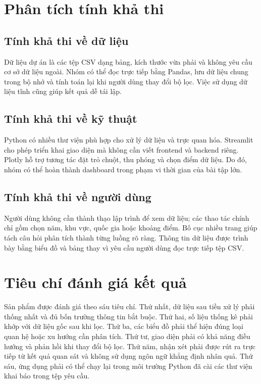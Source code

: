 \section{Phân tích tính khả thi}

\subsection{Tính khả thi về dữ liệu}

Dữ liệu dự án là các tệp CSV dạng bảng, kích thước vừa phải và không yêu cầu cơ sở dữ liệu ngoài. Nhóm có thể đọc trực tiếp bằng Pandas, lưu dữ liệu chung trong bộ nhớ và tính toán lại khi người dùng thay đổi bộ lọc. Việc sử dụng dữ liệu tĩnh cũng giúp kết quả dễ tái lập.

\subsection{Tính khả thi về kỹ thuật}

Python có nhiều thư viện phù hợp cho xử lý dữ liệu và trực quan hóa. Streamlit cho phép triển khai giao diện mà không cần viết frontend và backend riêng. Plotly hỗ trợ tương tác đặt trỏ chuột, thu phóng và chọn điểm dữ liệu. Do đó, nhóm có thể hoàn thành dashboard trong phạm vi thời gian của bài tập lớn.

\subsection{Tính khả thi về người dùng}

Người dùng không cần thành thạo lập trình để xem dữ liệu; các thao tác chính chỉ gồm chọn năm, khu vực, quốc gia hoặc khoảng điểm. Bố cục nhiều trang giúp tách câu hỏi phân tích thành từng luồng rõ ràng. Thông tin dữ liệu được trình bày bằng biểu đồ và bảng thay vì yêu cầu người dùng đọc trực tiếp tệp CSV.

\section{Tiêu chí đánh giá kết quả}

Sản phẩm được đánh giá theo sáu tiêu chí. Thứ nhất, dữ liệu sau tiền xử lý phải thống nhất và đủ bốn trường thông tin bắt buộc. Thứ hai, số liệu thống kê phải khớp với dữ liệu gốc sau khi lọc. Thứ ba, các biểu đồ phải thể hiện đúng loại quan hệ hoặc xu hướng cần phân tích. Thứ tư, giao diện phải có khả năng điều hướng và phản hồi khi thay đổi bộ lọc. Thứ năm, nhận xét phải được rút ra trực tiếp từ kết quả quan sát và không sử dụng ngôn ngữ khẳng định nhân quả. Thứ sáu, ứng dụng phải có thể chạy lại trong môi trường Python đã cài các thư viện khai báo trong tệp yêu cầu.
